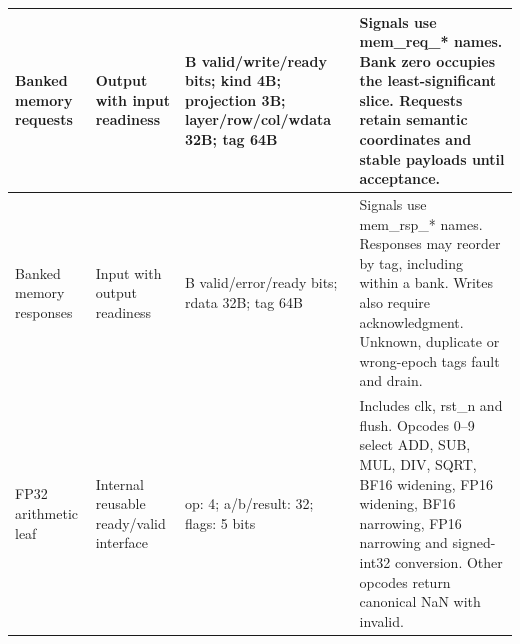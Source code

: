 \documentclass[11pt,a4paper]{article}
\begin{document}
{\begin{longtable}{@{}L{0.21\textwidth}|L{0.12\textwidth}|L{0.12\textwidth}|L{0.45\textwidth}@{}}
Banked memory requests & Output with input readiness & B valid/\allowbreak{}write/\allowbreak{}ready bits; kind 4B; projection 3B; layer/\allowbreak{}row/\allowbreak{}col/\allowbreak{}wdata 32B; tag 64B & Signals use mem\_\allowbreak{}req\_\allowbreak{}*\allowbreak{} names. Bank zero occupies the least-significant slice. Requests retain semantic coordinates and stable payloads until acceptance.\\[2pt]\hline

Banked memory responses & Input with output readiness & B valid/\allowbreak{}error/\allowbreak{}ready bits; rdata 32B; tag 64B & Signals use mem\_\allowbreak{}rsp\_\allowbreak{}*\allowbreak{} names. Responses may reorder by tag,\allowbreak{} including within a bank. Writes also require acknowledgment. Unknown,\allowbreak{} duplicate or wrong-epoch tags fault and drain.\\[2pt]\hline

FP32 arithmetic leaf & Internal reusable ready/\allowbreak{}valid interface & op: 4; a/\allowbreak{}b/\allowbreak{}result: 32; flags: 5 bits & Includes clk,\allowbreak{} rst\_\allowbreak{}n and flush. Opcodes 0–9 select ADD,\allowbreak{} SUB,\allowbreak{} MUL,\allowbreak{} DIV,\allowbreak{} SQRT,\allowbreak{} BF16 widening,\allowbreak{} FP16 widening,\allowbreak{} BF16 narrowing,\allowbreak{} FP16 narrowing and signed-int32 conversion. Other opcodes return canonical NaN with invalid.\\[2pt]\hline

\bottomrule\end{longtable}}
\end{document}
